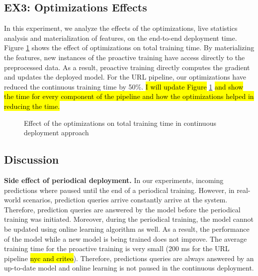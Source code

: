 \subsection{EX3: Optimizations Effects}
In this experiment, we analyze the effects of the optimizations, live statistics analysis and materialization of features, on the end-to-end deployment time.
Figure \ref{optimization-effect} shows the effect of optimizations on total training time.
By materializing the features, new instances of the proactive training have access directly to the preprocessed data.
As a result, proactive training directly computes the gradient and updates the deployed model.
For the URL pipeline, our optimizations have reduced the continuous training time by 50\%.
\hl{I will update Figure} \ref{optimization-effect} \hl{and show the time for every component of the pipeline and how the optimizations helped in reducing the time.}
\begin{figure}[h!]
\centering
\resizebox{\columnwidth}{!}{}
\caption{Effect of the optimizations on total training time in continuous deployment approach}
\label{optimization-effect}
\end{figure}

\subsection{Discussion} \label{subsec:discussion}
\textbf{Side effect of periodical deployment.}
In our experiments, incoming predictions where paused until the end of a periodical training.
However, in real-world scenarios, prediction queries arrive constantly arrive at the system.
Therefore, prediction queries are answered by the model before the periodical training was initiated. 
Moreover, during the periodical training, the model cannot be updated using online learning algorithm as well.
As a result, the performance of the model while a new model is being trained does not improve.
The average training time for the proactive training is very small (200 ms for the URL pipeline \hl{nyc and criteo}).
Therefore, predictions queries are always answered by an up-to-date model and online learning is not paused in the continuous deployment.


